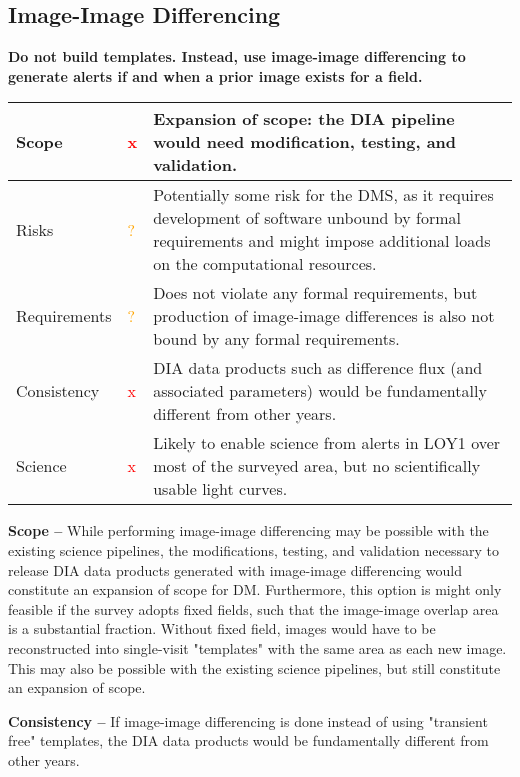 \documentclass[DM,lsstdraft,toc]{lsstdoc}
\begin{document}
\subsection{Image-Image Differencing}\label{ssec:potsol_imgimg}

{\bf Do not build templates. Instead, use image-image differencing to generate alerts if and when a prior image exists for a field.}

\begin{center}
\begin{tabular}{|p{2.5cm}|p{0.3cm}|p{13cm}|}
\hline
Scope & \textcolor{red}{x} & Expansion of scope: the DIA pipeline would need modification, testing, and validation. \\
\hline
Risks & \textcolor{orange}{?} & Potentially some risk for the DMS, as it requires development of software unbound by formal requirements and might impose additional loads on the computational resources. \\
\hline
Requirements & \textcolor{orange}{?} & Does not violate any formal requirements, but production of image-image differences is also not bound by any formal requirements. \\
\hline
Consistency & \textcolor{red}{x} & DIA data products such as difference flux (and associated parameters) would be fundamentally different from other years. \\
\hline
Science & \textcolor{red}{x} & Likely to enable science from alerts in LOY1 over most of the surveyed area, but no scientifically usable light curves. \\
\hline
\end{tabular}
\end{center}

{\bf Scope --} While performing image-image differencing may be possible with the existing science pipelines, the modifications, testing, and validation necessary to release DIA data products generated with image-image differencing would constitute an expansion of scope for DM. Furthermore, this option is might only feasible if the survey adopts fixed fields, such that the image-image overlap area is a substantial fraction. Without fixed field, images would have to be reconstructed into single-visit "templates" with the same area as each new image. This may also be possible with the existing science pipelines, but still constitute an expansion of scope.

{\bf Consistency --} If image-image differencing is done instead of using "transient free" templates, the DIA data products would be fundamentally different from other years. 
\end{document}
